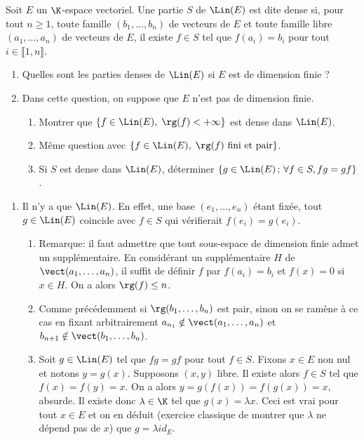 \begin{enonce}
\begin{exercise}[ID={RMS134 E576},subtitle={Oral
    Mines-Ponts},theme={algebre},annee={2023},concours={mines-ponts},filiere={MP}, difficulty={0}]
Soit $E$ un $\K$-espace vectoriel. Une partie $S$ de $\Lin(E)$ est
dite dense si, pour tout $n\ge 1$, toute famille $(b_1,\ldots,b_n)$ de
vecteurs de $E$ et toute famille libre $(a_1,\ldots,a_n)$ de vecteurs
de $E$, il existe $f\in S$ tel que $f(a_i)=b_i$ pour tout
$i\in\llbracket 1,n\rrbracket$.
\begin{enumerate}
\item Quelles sont les parties denses de $\Lin(E)$ si $E$ est de
  dimension finie ?
\item Dans cette question, on suppose que $E$ n'est pas de dimension
  finie.
  \begin{enumerate}
  \item Montrer que $\{f\in\Lin(E),\; \rg(f)< +\infty\}$ est dense dans
    $\Lin(E)$.
  \item Même question avec $\{f\in\Lin(E),\; \rg(f)\text{ fini et
      pair}\}$.
  \item Si $S$ est dense dans $\Lin(E)$, déterminer
    $\{g\in\Lin(E)\,;\,\forall f\in S, fg=gf\}$.
  \end{enumerate}
\end{enumerate}
\end{exercise}
\begin{solution}
  \begin{enumerate}
  \item Il n'y a que $\Lin(E)$. En effet, une base $(e_1,\ldots,e_n)$
    étant fixée, tout $g\in\Lin(E)$ coincide avec $f\in S$ qui
    vérifierait $f(e_i)=g(e_i)$.
    \begin{enumerate}
    \item Remarque: il faut admettre que tout sous-espace de dimension
      finie admet un supplémentaire. En considérant un supplémentaire
      $H$ de $\vect(a_1,\ldots,a_n)$, il suffit de définir $f$ par
      $f(a_i)=b_i$ et $f(x)=0$ si $x\in H$. On a alors $\rg(f)\le n$.
    \item Comme précédemment si $\rg(b_1,\ldots,b_n)$ est pair, sinon
      on se ramène à ce cas en fixant arbitrairement
      $a_{n_1}\notin\vect(a_1,\ldots,a_n)$ et
      $b_{n+1}\notin\vect(b_1,\ldots,b_n)$.
    \item Soit $g\in\Lin(E)$ tel que $fg=gf$ pour tout $f\in
      S$. Fixons $x\in E$ non nul et notons $y=g(x)$. Supposons
      $(x,y)$ libre. Il existe alors $f\in S$ tel que
      $f(x)=f(y)=x$. On a alors $y=g(f(x))=f(g(x))=x$, absurde. Il
      existe donc $\lambda\in\K$ tel que $g(x)=\lambda x$. Ceci est
      vrai pour tout $x\in E$ et on en déduit (exercice classique de
      montrer que $\lambda$ ne dépend pas de $x$) que $g=\lambda id_E$.
    \end{enumerate}
  \end{enumerate}
\end{solution}
\end{enonce}